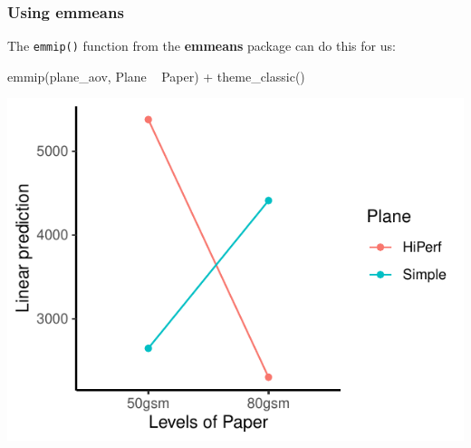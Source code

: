 \documentclass[a4paper]{article}\usepackage[]{graphicx}\usepackage[]{xcolor}
\makeatletter
\def\maxwidth{ %
  \ifdim\Gin@nat@width>\linewidth
    \linewidth
  \else
    \Gin@nat@width
  \fi
}
\makeatother
\begin{document}
\subsubsection{Using emmeans}
The \lstinline|emmip()| function from the \textbf{emmeans} package can do this for us:\\
\begin{minipage}[t]{0.49\textwidth}
\begin{Schunk}
\begin{Sinput}
emmip(plane_aov, Plane ~ Paper) +
  theme_classic()
\end{Sinput}


{\centering \includegraphics[width=\maxwidth]{figure/listings-unnamed-chunk-324-1} 

}

\end{Schunk}
\end{minipage}
\hspace{0.02\textwidth}
\end{document}
